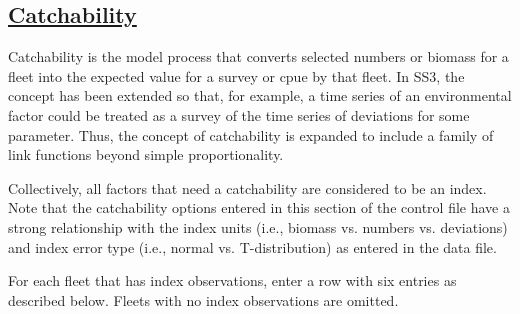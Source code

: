 \hypertarget{Qsetup}{}
\subsection[Catchability]{\protect\hyperlink{Qsetup}{Catchability}}
Catchability is the model process that converts selected numbers or biomass for a fleet into the expected value for a survey or \gls{cpue} by that fleet. In SS3, the concept has been extended so that, for example, a time series of an environmental factor could be treated as a survey of the time series of deviations for some parameter. Thus, the concept of catchability is expanded to include a family of link functions beyond simple proportionality.

Collectively, all factors that need a catchability are considered to be an index. Note that the catchability options entered in this section of the control file have a strong relationship with the index units (i.e., biomass vs. numbers vs. deviations) and index error type (i.e., normal vs. T-distribution) as entered in the data file.

For each fleet that has index observations, enter a row with six entries as described below. Fleets with no index observations are omitted.

